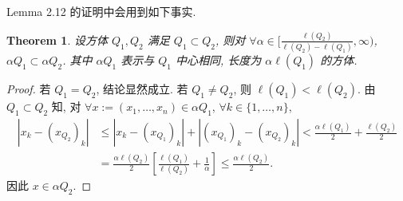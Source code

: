 \documentclass[a4paper,11pt]{article}
\newtheorem{theorem}{Theorem}[section]
\theoremstyle{definition}
\begin{document}
\begin{CJK*}{UTF8}{gbsn}
Lemma 2.12 的证明中会用到如下事实.

\begin{theorem}
    设方体 $ Q_1, Q_2 $ 满足 $ Q_1 \subset Q_2 $, 
    则对 $ \forall \alpha \in [\frac{\ell(Q_2)}{\ell(Q_2) - \ell(Q_1)}, \infty) $, 
    $ \alpha Q_1 \subset \alpha Q_2 $. 其中 $ \alpha Q_1 $ 表示与 $ Q_1 $ 中心相同, 长度为 $ \alpha \ell(Q_1) $ 的方体.
\end{theorem}

\begin{proof}
    若 $ Q_1 = Q_2 $, 结论显然成立. 若 $ Q_1 \neq Q_2 $, 则 $ \ell(Q_1) < \ell(Q_2) $.
    由 $ Q_1 \subset Q_2 $ 知,
    对 $ \forall x := (x_1, \ldots, x_n) \in \alpha Q_1 $, $ \forall k \in \{1, \ldots, n\} $,
    \begin{align*}
        |x_k - (x_{Q_2})_k| 
            &\leq |x_k - (x_{Q_1})_k| + |(x_{Q_1})_k - (x_{Q_2})_k|
            < \frac{\alpha \ell(Q_1)}{2} + \frac{\ell(Q_2)}{2} \\
            &= \frac{\alpha \ell(Q_2)}{2} \left[ \frac{\ell(Q_1)}{\ell(Q_2)} + \frac{1}{\alpha} \right]
            \leq \frac{\alpha \ell(Q_2)}{2}.
    \end{align*}
    因此 $ x \in \alpha Q_2 $.
\end{proof}

\end{CJK*}
\end{document}
